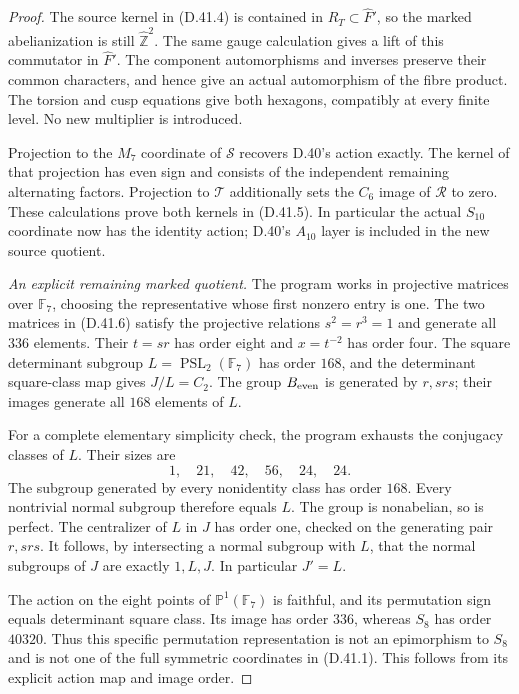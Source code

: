 \begin{proof}
The source kernel in (D.41.4) is contained in
$R_T\subset\widehat F'$, so the marked
abelianization is still $\widehat{\mathbb Z}^2$.
The same gauge calculation gives a lift of
this commutator in $\widehat F'$.
The component automorphisms and inverses
preserve their common characters, and hence
give an actual automorphism of the fibre
product. The torsion and cusp equations
give both hexagons, compatibly at every
finite level. No new multiplier is introduced.

Projection to the $M_7$ coordinate of
$\mathcal S$ recovers D.40's action exactly.
The kernel of that projection has even sign
and consists of the independent remaining
alternating factors. Projection to
$\mathcal T$ additionally sets the $C_6$
image of $\mathcal R$ to zero. These
calculations prove both kernels in
(D.41.5). In particular the actual $S_{10}$
coordinate now has the identity action;
D.40's $A_{10}$ layer is included in the
new source quotient.

\emph{An explicit remaining marked quotient.}
The program works in projective matrices
over $\mathbb F_7$, choosing the representative
whose first nonzero entry is one.
The two matrices in (D.41.6) satisfy the
projective relations $s^2=r^3=1$ and generate
all $336$ elements. Their $t=sr$ has order eight
and $x=t^{-2}$ has order four. The square determinant
subgroup
$L=\operatorname{PSL}_2(\mathbb F_7)$ has
order $168$, and the determinant square-class
map gives $J/L=C_2$. The group $B_{\rm even}$
is generated by $r,srs$; their images generate
all $168$ elements of $L$.

For a complete elementary simplicity check,
the program exhausts the conjugacy classes
of $L$. Their sizes are
\[
 1,\quad21,\quad42,\quad56,\quad24,\quad24.
                                                               \tag{D.41.11}
\]
The subgroup generated by every nonidentity
class has order $168$. Every nontrivial
normal subgroup therefore equals $L$.
The group is nonabelian, so is perfect.
The centralizer of $L$ in $J$ has order
one, checked on the generating pair
$r,srs$. It follows, by intersecting a
normal subgroup with $L$, that the normal
subgroups of $J$ are exactly $1,L,J$.
In particular $J'=L$.

The action on the eight points of
$\mathbb P^1(\mathbb F_7)$ is faithful, and
its permutation sign equals determinant
square class. Its image has order $336$,
whereas $S_8$ has order $40320$. Thus this
specific permutation representation is not
an epimorphism to $S_8$ and is not one of
the full symmetric coordinates in (D.41.1).
This follows from its explicit action map
and image order.


\end{proof}

